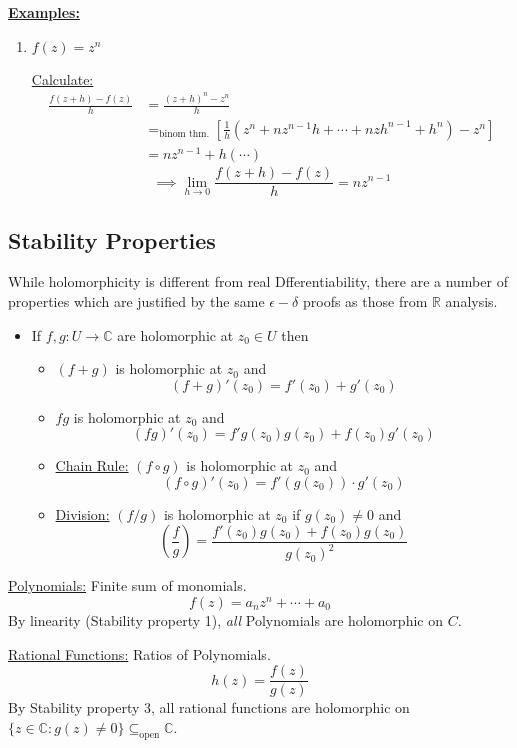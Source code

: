 \documentclass{article}
\newcommand{\R}{\mathbb{R}}
\newcommand{\C}{\mathbb{C}}
\begin{document}
\vskip 0.5cm
\underline{\textbf{Examples:}}
\begin{enumerate}
  \item $f(z) = z^n$ 
  
  \vskip 0.5cm
  \underline{Calculate:} 
  \begin{align*}
    \frac{f(z+h)-f(z)}{h} &= \frac{(z+h)^n - z^n}{h} \\
    &=_{\text{binom thm.}} \left[  \frac{1}{h} \left( z^n + nz^{n-1}h + \cdots + nzh^{n-1} + h^n \right) - z^n  \right] \\
    &= nz^{n-1} + h(\cdots)
  \end{align*}
  \[ \implies \lim_{h \rightarrow 0} \frac{f(z + h) - f(z)}{h} = nz^{n-1} \]
\end{enumerate}

\vskip 1cm
\subsection{Stability Properties}
While holomorphicity is different from real Dfferentiability, there are a number of properties which are justified by the same $\epsilon-\delta$ proofs as those from $\R$ analysis.

\begin{itemize}
  \item If $f,g : U \rightarrow \C$ are holomorphic at $z_0 \in U$ then 
  \begin{itemize}
    \item $(f+g)$ is holomorphic at $z_0$ and 
    \[ (f+g)'(z_0) = f'(z_0) + g'(z_0) \]
  
    \item $fg$ is holomorphic at $z_0$ and
    \[ (fg)'(z_0) = f'g(z_0)g(z_0) + f(z_0)g'(z_0) \]
    
    \vskip 0.5cm
    \item \underline{Chain Rule:} $(f \circ g)$ is holomorphic at $z_0$ and 
    \[ (f \circ g)'(z_0) = f'(g(z_0)) \cdot g'(z_0) \]
    
    \vskip 0.5cm
    \item \underline{Division:} $(f/g)$ is holomorphic at $z_0$ if $g(z_0) \neq 0$ and
    \[ \left( \frac{f}{g} \right) = \frac{f'(z_0)g(z_0) + f(z_0)g(z_0)}{g(z_0)^2} \]
  \end{itemize}
\end{itemize}

\vskip 0.5cm
\begin{dottedbox}
  \underline{Polynomials:} Finite sum of monomials.
  \[ f(z) = a_nz^n + \cdots + a_0 \]
  By linearity (Stability property 1), \emph{all} Polynomials are holomorphic on $C$.
  
  \vskip 1cm
  \underline{Rational Functions:} Ratios of Polynomials.
  \[ h(z) = \frac{f(z)}{g(z)} \]
  By Stability property 3, all rational functions are holomorphic on $\{ z \in \C : g(z) \neq 0 \} \subseteq_{\text{open}} \C$.
\end{dottedbox}
\end{document}
